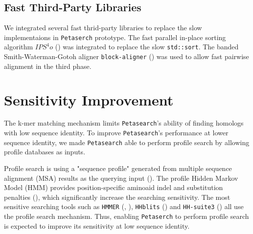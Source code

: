 \subsection{Fast Third-Party Libraries}

We integrated several fast thrid-party libraries to replace the slow implementaions in \texttt{Petaserch} prototype. The fast parallel in-place sorting algorithm $IPS^4o$ (\cite{axtmann2017place}) was integrated to replace the slow \texttt{std::sort}. The banded Smith-Waterman-Gotoh aligner \texttt{block-aligner} (\cite{liu2021block}) was used to allow fast pairwise alignment in the third phase.

\section{Sensitivity Improvement}

The k-mer matching mechanism limits \texttt{Petasearch}'s ability of finding homologs with low sequence identity. To improve \texttt{Petasearch}'s performance at lower sequence identity, we made \texttt{Petasearch} able to perform profile search by allowing profile databases as inputs.

Profile search is using a "sequence profile" generated from multiple sequence alignment (MSA) results as the querying input (\cite{steinegger2019hh}). The profile Hidden Markov Model (HMM) provides position-specific aminoaid indel and substitution penalties (\cite{steinegger2019hh}), which significantly increase the searching sensitivity. The most sensitive searching tools such as \texttt{HMMER} (\cite{eddy2009new}, \cite{eddy2011accelerated}), \texttt{HHblits} (\cite{remmert2012hhblits}) and \texttt{HH-suite3} (\cite{steinegger2019hh}) all use the profile search mechanism. Thus, enabling \texttt{Petaserch} to perform profile search is expected to improve its sensitivity at low sequence identity.
